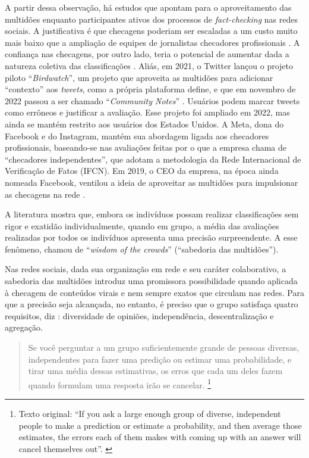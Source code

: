 \documentclass[portuguese]{textolivre}
\begin{document}
A partir dessa observação, há estudos que apontam para o aproveitamento das multidões enquanto participantes ativos dos processos de \emph{fact-checking} nas redes sociais. A justificativa é que checagens poderiam ser escaladas a um custo muito mais baixo que a ampliação de equipes de jornalistas checadores profissionais \cite{allen_scaling_2021, pennycook_fighting_2019}. A confiança nas checagens, por outro lado, teria o potencial de aumentar dada a natureza coletiva das classificações \cite{prollochs_community-based_nodate}. Aliás, em 2021, o Twitter lançou o projeto piloto “\emph{Birdwatch}”, um projeto que aproveita as multidões para adicionar “contexto” aos \emph{tweets}, como a própria plataforma define, e que em novembro de 2022 passou a ser chamado “\emph{Community Notes}” \cite{coleman2021, twitter_birdwatch_2022}. Usuários podem marcar tweets como errôneos e justificar a avaliação. Esse projeto foi ampliado em 2022, mas ainda se mantém restrito aos usuários dos Estados Unidos. A Meta, dona do Facebook e do Instagram, mantém sua abordagem ligada aos checadores profissionais, baseando-se nas avaliações feitas por o que a empresa chama de “checadores independentes”, que adotam a metodologia da Rede Internacional de Verificação de Fatos (IFCN). Em 2019, o CEO da empresa, na época ainda nomeada Facebook, ventilou a ideia de aproveitar as multidões para impulsionar as checagens na rede \cite{bell2019}.

A literatura mostra que, embora os indivíduos possam realizar classificações sem rigor e exatidão individualmente, quando em grupo, a média das avaliações realizadas por todos os indivíduos apresenta uma precisão surpreendente. A esse fenômeno, \textcite{surowiecki_wisdom_2005} chamou de “\emph{wisdom of the crowds}” (“sabedoria das multidões”).

Nas redes sociais, dada sua organização em rede e seu caráter colaborativo, a sabedoria das multidões introduz uma promissora possibilidade quando aplicada à checagem de conteúdos virais e nem sempre exatos que circulam nas redes. Para que a precisão seja alcançada, no entanto, é preciso que o grupo satisfaça quatro requisitos, diz \textcite{surowiecki_wisdom_2005}: diversidade de opiniões, independência, descentralização e agregação.

\begin{quote}
    Se você perguntar a um grupo suficientemente grande de pessoas diversas, independentes para fazer uma predição ou estimar uma probabilidade, e tirar uma média dessas estimativas, os erros que cada um deles fazem quando formulam uma resposta irão se cancelar. \cite[p. 10, tradução nossa]{surowiecki_wisdom_2005}\footnote{Texto original: “If you ask a large enough group of diverse, independent people to make a prediction or estimate a probability, and then average those estimates, the errors each of them makes with coming up with an answer will cancel themselves out”. \cite[p. 10]{surowiecki_wisdom_2005}}
\end{quote}
\end{document}
